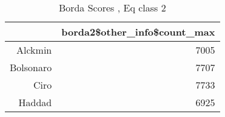 \begin{table}[ht]
\centering
\begin{tabular}{rr}
  \hline
 & borda2\$other\_info\$count\_max \\ 
  \hline
Alckmin & 7005 \\ 
  Bolsonaro & 7707 \\ 
  Ciro & 7733 \\ 
  Haddad & 6925 \\ 
   \hline
\end{tabular}
\caption{Borda Scores , Eq class 2} 
\label{tbl:subtab2_eq2}
\end{table}
